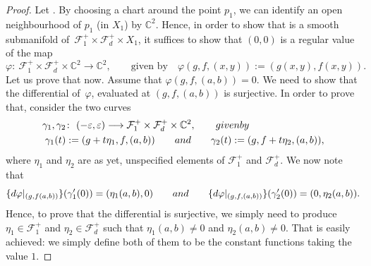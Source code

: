 \documentclass[11pt]{article}
\numberwithin{equation}{section}
\begin{document}
\begin{proof}
Let .
By choosing a chart around the point $p_1$, we can identify an open neighbourhood of
$p_1$ (in $X_1$) by $\mathbb{C}^2$. Hence, in order to show that
 is a smooth
submanifold of~${\mathcal{F}_1^{+} \times \mathcal{F}_d^{+} \times X_1}$, it suffices to show that
$(0,0)$ is a regular value of the map
\[\varphi \colon\ \mathcal{F}_1^{+} \times \mathcal{F}_d^{+} \times \mathbb{C}^2 \longrightarrow
\mathbb{C}^2,
\qquad \text{given by}
\quad \varphi(g, f, (x, y)) := (g(x, y), f(x, y)).\]
Let us prove that now. Assume that $\varphi(g,f,(a,b))=0$.
We need to show that the differential of~$\varphi$,
evaluated at $(g, f, (a, b))$ is surjective.
In order to prove that, consider the two curves
\begin{align*}
\gamma_1, \gamma_2&\colon\ (-\varepsilon, \varepsilon)\longrightarrow
\mathcal{F}_1^{+} \times \mathcal{F}_d^{+} \times \mathbb{C}^2,
\qquad \textnormal{given by} \\
\gamma_1(t)&:= (g + t\eta_1, f, (a, b)) \qquad \textnormal{and}
\qquad \gamma_2(t):= (g, f+t\eta_2, (a, b)),
\end{align*}
where
$\eta_1$ and $\eta_2$ are as yet, unspecified elements of
$\mathcal{F}_1^{+}$ and $\mathcal{F}_d^{+}$.
We now note that
\[\{{\rm d}\varphi|_{(g,f(a,b))}\}(\gamma_1^{\prime}(0)) = (\eta_1(a,b), 0)
\qquad \textnormal{and} \qquad \{{\rm d}\varphi|_{(g,f,(a,b))}\}(\gamma_2^{\prime}(0)) = (0, \eta_2(a,b)).\]
Hence, to prove that the differential is surjective, we simply need to produce
$\eta_1 \in \mathcal{F}_1^{+}$ and $\eta_2 \in \mathcal{F}_d^{+}$
such that $\eta_1(a,b) \neq 0$ and $\eta_2(a,b) \neq 0$.
That is easily achieved: we simply define both of them to be the constant functions
taking the value $1$.


\end{proof}
\end{document}
